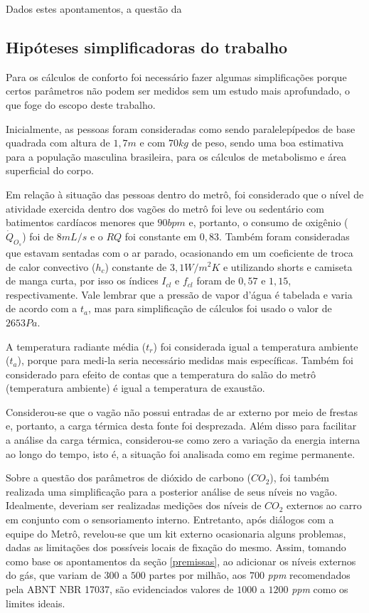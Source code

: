 \documentclass[acronym,symbols,table]{fei}
\begin{document}
Dados estes apontamentos, a questão da 

\subsection{Hipóteses simplificadoras do trabalho} \label{simplificação}

Para os cálculos de conforto foi necessário fazer algumas simplificações porque certos parâmetros não podem ser medidos sem um estudo mais aprofundado, o que foge do escopo deste trabalho. 

Inicialmente, as pessoas foram consideradas como sendo paralelepípedos de base quadrada com altura de $1,7 m$ e com $70 kg$ de peso, sendo uma boa estimativa para a população masculina brasileira, para os cálculos de metabolismo e área superficial do corpo.

Em relação à situação das pessoas dentro do metrô, foi considerado que o nível de atividade exercida dentro dos vagões do metrô foi leve ou sedentário com batimentos cardíacos menores que $90 bpm$ e, portanto, o consumo de oxigênio ($\dot{Q}_{O_{s}}$) foi de $8 mL/s$ e o $RQ$ foi constante em $0,83$. Também foram consideradas que estavam sentadas com o ar parado, ocasionando em um coeficiente de troca de calor convectivo ($h_{c}$) constante de $3,1 W/m^2K$ e utilizando shorts e camiseta de manga curta, por isso os índices $I_{cl}$ e $f_{cl}$ foram de $0,57$ e $1,15$, respectivamente. Vale lembrar que a pressão de vapor d'água é tabelada e varia de acordo com a $t_{a}$, mas para simplificação de cálculos foi usado o valor de $2653 Pa$.

A temperatura radiante média ($t_{r}$) foi considerada igual a temperatura ambiente ($t_{a}$), porque para medi-la seria necessário medidas mais específicas.  Também foi considerado para efeito de contas que a temperatura do salão do metrô (temperatura ambiente) é igual a temperatura de exaustão.
   
Considerou-se que o vagão não possui entradas de ar externo por meio de frestas e, portanto, a carga térmica desta fonte foi desprezada. Além disso para facilitar a análise da carga térmica, considerou-se como zero a variação da energia interna ao longo do tempo, isto é, a situação foi analisada como em regime permanente.

Sobre a questão dos parâmetros de dióxido de carbono (${CO}_{2}$), foi também realizada uma simplificação para a posterior análise de seus níveis no vagão. Idealmente, deveriam ser realizadas medições dos níveis de ${CO}_{2}$ externos ao carro em conjunto com o sensoriamento interno. Entretanto, após diálogos com a equipe do Metrô, revelou-se que um kit externo ocasionaria alguns problemas, dadas as limitações dos possíveis locais de fixação do mesmo. Assim, tomando como base os apontamentos da seção \ref{premissas}, ao adicionar os níveis externos do gás, que variam de $300$ a $500$ partes por milhão, aos $700$ \textit{ppm} recomendados pela ABNT NBR 17037, são evidenciados valores de $1000$ a $1200$ \textit{ppm} como os limites ideais. 
\end{document}
